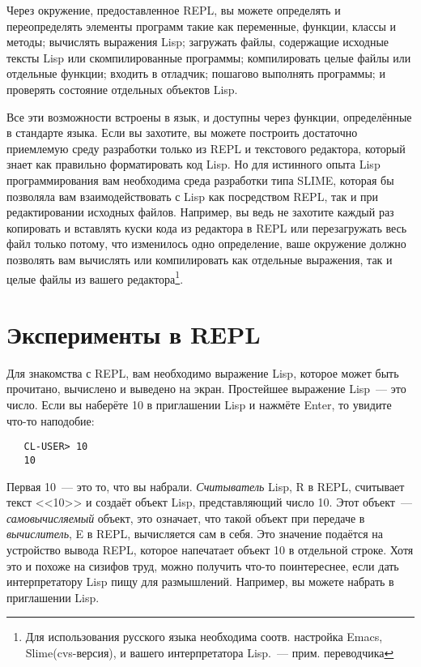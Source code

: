 Через окружение, предоставленное REPL, вы можете определять и переопределять элементы
программ такие как переменные, функции, классы и методы; вычислять выражения Lisp;
загружать файлы, содержащие исходные тексты Lisp или скомпилированные программы;
компилировать целые файлы или отдельные функции; входить в отладчик; пошагово выполнять
программы; и проверять состояние отдельных объектов Lisp.

Все эти возможности встроены в язык, и доступны через функции, определённые в стандарте
языка. Если вы захотите, вы можете построить достаточно приемлемую среду разработки только
из REPL и текстового редактора, который знает как правильно форматировать код Lisp. Но для
истинного опыта Lisp программирования вам необходима среда разработки типа SLIME, которая
бы позволяла вам взаимодействовать с Lisp как посредством REPL, так и при редактировании
исходных файлов. Например, вы ведь не захотите каждый раз копировать и вставлять куски
кода из редактора в REPL или перезагружать весь файл только потому, что изменилось одно
определение, ваше окружение должно позволять вам вычислять или компилировать как отдельные
выражения, так и целые файлы из вашего редактора\footnote{Для использования русского языка
  необходима соотв. настройка Emacs, Slime(cvs-версия), и вашего интерпретатора Lisp.~---
  прим. переводчика}.

\section{Эксперименты в REPL}

Для знакомства с REPL, вам необходимо выражение Lisp, которое может быть прочитано,
вычислено и выведено на экран. Простейшее выражение Lisp~--- это число. Если вы наберёте
10 в приглашении Lisp и нажмёте Enter, то увидите что-то наподобие:

\begin{verbatim}
   CL-USER> 10
   10
\end{verbatim}

Первая 10~--- это то, что вы набрали. \emph{Считыватель} Lisp, R в REPL, считывает текст <<10>> и
создаёт объект Lisp, представляющий число 10. Этот объект~--- \emph{самовычисляемый} объект,
это означает, что такой объект при передаче в \emph{вычислитель}, E в REPL, вычисляется сам в
себя. Это значение подаётся на устройство вывода REPL, которое напечатает объект 10 в
отдельной строке. Хотя это и похоже на сизифов труд, можно получить что-то поинтереснее,
если дать интерпретатору Lisp пищу для размышлений. Например, вы можете набрать  в
приглашении Lisp.

